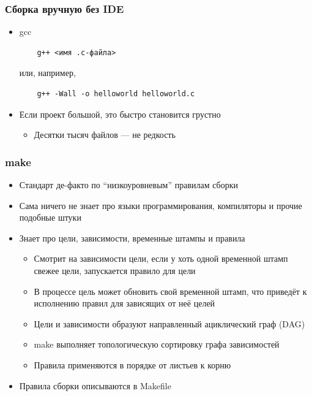 \documentclass{../../slides-style}
\begin{document}
    \begin{frame}[fragile]
        \frametitle{Сборка вручную без IDE}
        \begin{itemize}
            \item gcc
            \begin{footnotesize}
                \begin{verbatim}
    g++ <имя .c-файла>
                \end{verbatim}
            \end{footnotesize}
            или, например,
            \begin{footnotesize}
                \begin{verbatim}
    g++ -Wall -o helloworld helloworld.c
                \end{verbatim}
            \end{footnotesize}
            \item Если проект большой, это быстро становится грустно
            \begin{itemize}
                \item Десятки тысяч файлов --- не редкость
            \end{itemize}
        \end{itemize}
    \end{frame}

    \begin{frame}
        \frametitle{make}
        \begin{itemize}
            \item Стандарт де-факто по ``низкоуровневым'' правилам сборки
            \item Сама ничего не знает про языки программирования, компиляторы и прочие подобные штуки
            \item Знает про цели, зависимости, временные штампы и правила
            \begin{itemize}
                \item Смотрит на зависимости цели, если у хоть одной временной штамп свежее цели, запускается правило для цели
                \item В процессе цель может обновить свой временной штамп, что приведёт к исполнению правил для зависящих от неё целей
                \item Цели и зависимости образуют направленный ациклический граф (DAG)
                \item make выполняет топологическую сортировку графа зависимостей
                \item Правила применяются в порядке от листьев к корню
            \end{itemize}
            \item Правила сборки описываются в Makefile
        \end{itemize}
    \end{frame}
\end{document}
